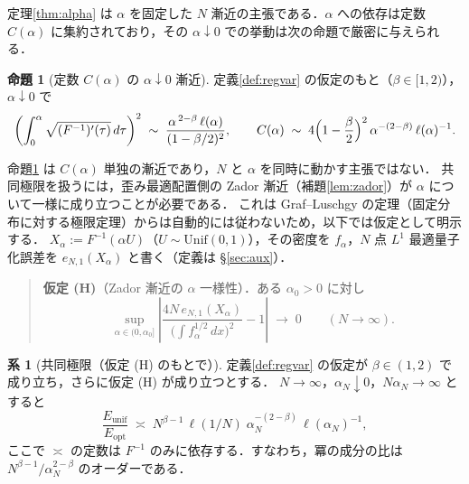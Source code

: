 \documentclass[a4paper,10pt]{jsarticle}
\theoremstyle{definition}
\newtheorem{proposition}{命題}[section]
\newtheorem{corollary}{系}[section]
\newcommand{\Finv}{F^{-1}}
\newcommand{\eN}{e_{N,1}}
\newcommand{\Eunif}{E_{\mathrm{unif}}}
\newcommand{\Eopt}{E_{\mathrm{opt}}}
\begin{document}
定理\ref{thm:alpha} は $\alpha$ を固定した $N$ 漸近の主張である．$\alpha$ への依存は定数 $C(\alpha)$ に集約されており，その $\alpha\downarrow0$ での挙動は次の命題で厳密に与えられる．

\begin{proposition}[定数 $C(\alpha)$ の $\alpha\downarrow0$ 漸近]
\label{prop:alpha}
定義\ref{def:regvar} の仮定のもと（$\beta\in[1,2)$），$\alpha\downarrow0$ で
\begin{equation}
  \left(\int_0^\alpha\sqrt{(\Finv)'(\tau)}\,d\tau\right)^{2}
  \;\sim\;\frac{\alpha^{\,2-\beta}\,\ell(\alpha)}{(1-\beta/2)^{2}},
  \qquad
  C(\alpha)\;\sim\;4\Bigl(1-\frac\beta2\Bigr)^{2}\,\alpha^{-(2-\beta)}\,\ell(\alpha)^{-1}.
  \label{eq:alpha-scaling}
\end{equation}
\end{proposition}

命題\ref{prop:alpha} は $C(\alpha)$ 単独の漸近であり，$N$ と $\alpha$ を同時に動かす主張ではない．
共同極限を扱うには，歪み最適配置側の Zador 漸近（補題\ref{lem:zador}）が $\alpha$ について一様に成り立つことが必要である．
これは Graf--Luschgy の定理（固定分布に対する極限定理）からは自動的には従わないため，以下では仮定として明示する．
$X_\alpha:=\Finv(\alpha U)$（$U\sim\mathrm{Unif}(0,1)$），その密度を $f_\alpha$，$N$ 点 $L^1$ 最適量子化誤差を $\eN(X_\alpha)$ と書く（定義は §\ref{sec:aux}）．

\begin{quote}
\textbf{仮定 (H)}（Zador 漸近の $\alpha$ 一様性）．ある $\alpha_0>0$ に対し
\begin{equation*}
  \sup_{\alpha\in(0,\alpha_0]}\left|\frac{4N\,\eN(X_\alpha)}{\bigl(\int f_\alpha^{1/2}\,dx\bigr)^{2}}-1\right|\;\longrightarrow\;0\qquad(N\to\infty).
\end{equation*}
\end{quote}

\begin{corollary}[共同極限（仮定 (H) のもとで）]
\label{cor:joint}
定義\ref{def:regvar} の仮定が $\beta\in(1,2)$ で成り立ち，さらに仮定 (H) が成り立つとする．
$N\to\infty$，$\alpha_N\downarrow0$，$N\alpha_N\to\infty$ とすると
\begin{equation}
  \frac{\Eunif}{\Eopt}
  \;\asymp\;N^{\beta-1}\,\ell(1/N)\;\alpha_N^{-(2-\beta)}\,\ell(\alpha_N)^{-1},
  \label{eq:conj-scaling2}
\end{equation}
ここで $\asymp$ の定数は $\Finv$ のみに依存する．すなわち，冪の成分の比は $N^{\beta-1}/\alpha_N^{2-\beta}$ のオーダーである．
\end{corollary}
\end{document}
